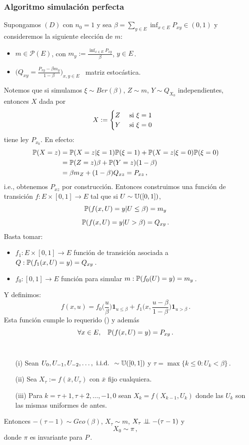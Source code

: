 \subsubsection{Algoritmo simulación perfecta}
Supongamos $(D)$ con $n_0=1$ y sea $\beta=\displaystyle\sum_{y\in E}\inf_{x\in E}P_{xy}\in(0,1)$ y consideremos la siguiente elección de $m$:
\begin{itemize}
    \item $m\in\mathcal{P}(E)$, con $m_y:=\displaystyle\frac{\inf_{x\in E}P_{xy}}{\beta}$, $y\in E$\,.
    \item $\bigg(Q_{xy}=\displaystyle\frac{P_{xy}-\beta m_y}{1-\beta}\bigg)_{x,y\in E}$ \, matriz estocástica.
\end{itemize}
Notemos que si simulamos $\xi\sim Ber(\beta)$, $Z\sim m$, $Y\sim Q_{X_0}$ independientes, entonces $X$ dada por 
$$ X:=\begin{cases}
Z
& \mbox{ si }\xi=1\\
Y & \mbox{ si }\xi=0
\end{cases}\espacio $$
 tiene ley $P_{x_0}$. En efecto:
\begin{alignat*}{2}
    \P(X=z) & = \P(X=z|\xi=1)\P(\xi=1)+\P(X=z|\xi=0)\P(\xi=0) \\
     & = \P(Z=z)\beta + \P(Y=z)(1-\beta)\\
     & = \beta m_Z+(1-\beta)Q_{xz} = P_{xz}\,,
\end{alignat*}
i.e., obtenemos $P_{xz}$ por construcción.
\newp Entonces construimos una función de transición $f:E\times [0,1]\to E$ tal que si $U\sim\unif$,
$$ \P(f(x,U)=y|U\leq \beta)=m_y$$
$$ \P(f(x,U)=y|U>\beta)=Q_{xy}\,.$$
Basta tomar:
\begin{itemize}
    \item $f_1:E\times[0,1]\to E$ función de transición asociada a $Q:\P(f_1(x,U)=y)=Q_{xy}$\,.
    \item $f_0:[0,1]\to E$ función para simular $m:\P(f_0(U)=y)=m_y$\,.
\end{itemize}
Y definimos: 
$$f(x,u)=f_0\bigg(\frac{u}{\beta}\bigg)\mathbf{1}_{u\leq\beta}+f_1\bigg(x,\frac{u-\beta}{1-\beta}\bigg)\mathbf{1}_{u>\beta}\, .$$
Esta función cumple lo requerido (\ejercicio) y además 
$$\forall x\in E,\espacio \P(f(x,U)=y)=P_{xy}\,.$$
\vspace{1.5cm}\\
\begin{theorem}
\beforeitemize
\begin{enumerate}
    \item[(i)] Sean $U_0,U_{-1},U_{-2},\dots,\iid\sim\unif$ y $\tau=\max\{k\leq 0:U_k<\beta\}$\,.
    \item[(ii)] Sea $X_\tau:=f(\bar{x},U_\tau)$ con $\bar{x}$ fijo cualquiera.
    \item[(iii)] Para $k=\tau+1,\tau+2,\dots,-1,0$ sean $X_k=f(X_{k-1},U_k)$ donde las $U_k$ son las mismas uniformes de antes.  %
\end{enumerate}
Entonces $-(\tau-1)\sim Geo(\beta)$, $X_\tau\sim m$, $X_\tau\indep-(\tau-1)$ y  %
$$ X_0\sim\pi\,,$$
donde $\pi$ es invariante para $P$\,.
\end{theorem}
